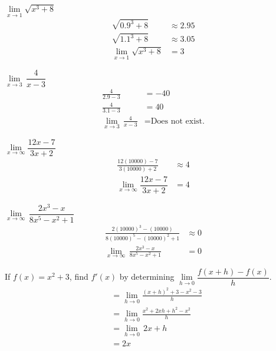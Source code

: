 \documentclass[12pt]{article}
\newenvironment{problem}[2][]{
    \begin{trivlist}
        \item[
            {\bfseries #1}
            {\bfseries #2.}
        ]
}{\end{trivlist}}
\begin{document}
\begin{problem}{5}
    $\underset{x \to 1}{\lim} \sqrt{x^3 + 8}$
    \begin{align}
        \sqrt{0.9^3 + 8} &\approx 2.95 \\
        \sqrt{1.1^3 + 8} &\approx 3.05 \\
        \underset{x \to 1}{\lim} \sqrt{x^3 + 8} &= 3 
    \end{align}
\end{problem}

\begin{problem}{6}
    $\underset{x \to 3}{\lim} \, \dfrac{4}{x - 3}$
    \begin{align}
        \frac{4}{2.9 - 3} &= -40 \\
        \frac{4}{3.1 - 3} &= 40 \\
        \underset{x \to 3}{\lim} \, \frac{4}{x - 3} &= \text{Does not exist.}
    \end{align}
\end{problem}

\begin{problem}{7}
    $\underset{x \to \infty}{\lim} \dfrac{12x - 7}{3x + 2}$
    \begin{align}
        \frac{12 \left(10000\right) - 7}{3 \left(10000\right) + 2} &\approx 4 \\
        \underset{x \to \infty}{\lim} \dfrac{12x - 7}{3x + 2} &= 4
    \end{align}
\end{problem}

\begin{problem}{8}
    $\underset{x \to \infty}{\lim} \, \dfrac{2x^3 - x}{8x^5 - x^2 + 1}$
    \begin{align}
        \frac{2\left(10000\right)^3 - \left(10000\right)}{8\left(10000\right)^5 - \left(10000\right)^2 + 1} &\approx 0 \\
        \underset{x \to \infty}{\lim} \, \frac{2x^3 - x}{8x^5 - x^2 + 1} &= 0
    \end{align}
\end{problem}

\begin{problem}{9}
    If $f(x) = x^2 + 3$, find $f'(x)$ by determining $\underset{h \to 0}{\lim} \dfrac{f(x + h) - f(x)}{h}.$
    \begin{align}
        &= \underset{h \to 0}{\lim} \frac{\left(x + h\right)^2 + 3 - x^2 - 3}{h} \\
        &= \underset{h \to 0}{\lim} \frac{x^2 + 2xh + h^2 - x^2}{h} \\
        &= \underset{h \to 0}{\lim} \, 2x + h \\
        &= 2x
    \end{align}
\end{problem}
\end{document}
